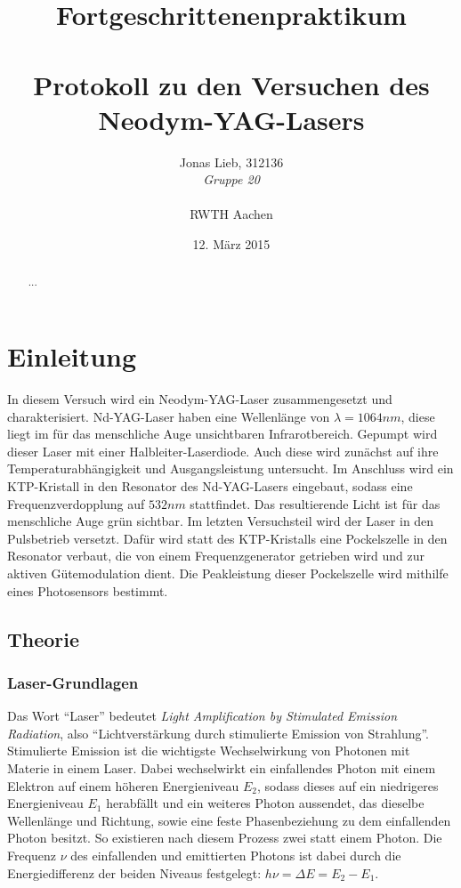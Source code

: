 \documentclass{../Misc/MontavonLaTeX/Montavon}
\date{12. März 2015}
\begin{document}
\title{Fortgeschrittenenpraktikum \\ \quad \\ Protokoll zu den Versuchen des Neodym-YAG-Lasers}
\author{Jonas Lieb, 312136 \\ \emph{Gruppe 20} \\ \\  RWTH Aachen}
\maketitle

\begin{abstract}
...
\end{abstract}
\newpage

\tableofcontents
\newpage

\section{Einleitung}
In diesem Versuch wird ein Neodym-YAG-Laser zusammengesetzt und charakterisiert. Nd-YAG-Laser haben eine Wellenlänge von $\lambda = 1064 \unit{nm}$, diese liegt im für das menschliche Auge unsichtbaren Infrarotbereich. 
Gepumpt wird dieser Laser mit einer Halbleiter-Laserdiode. Auch diese wird zunächst auf ihre Temperaturabhängigkeit und Ausgangsleistung untersucht.
Im Anschluss wird ein KTP-Kristall in den Resonator des Nd-YAG-Lasers eingebaut, sodass eine Frequenzverdopplung auf $532 \unit{nm}$ stattfindet. Das resultierende Licht ist für das menschliche Auge grün sichtbar.
Im letzten Versuchsteil wird der Laser in den Pulsbetrieb versetzt. Dafür wird statt des KTP-Kristalls eine Pockelszelle in den Resonator verbaut, die von einem Frequenzgenerator getrieben wird und zur aktiven Gütemodulation dient. Die Peakleistung dieser Pockelszelle wird mithilfe eines Photosensors bestimmt.

\subsection{Theorie}
\subsubsection{Laser-Grundlagen}
Das Wort \enquote{Laser} bedeutet \emph{Light Amplification by Stimulated Emission Radiation}, also \enquote{Lichtverstärkung durch stimulierte Emission von Strahlung}. Stimulierte Emission ist die wichtigste Wechselwirkung von Photonen mit Materie in einem Laser. Dabei wechselwirkt ein einfallendes Photon mit einem Elektron auf einem höheren Energieniveau $E_2$, sodass dieses auf ein niedrigeres Energieniveau $E_1$ herabfällt und ein weiteres Photon aussendet, das dieselbe Wellenlänge und Richtung, sowie eine feste Phasenbeziehung zu dem einfallenden Photon besitzt. So existieren nach diesem Prozess zwei statt einem Photon. Die Frequenz $\nu$ des einfallenden und emittierten Photons ist dabei durch die Energiedifferenz der beiden Niveaus festgelegt: $h \nu = \Delta E = E_2 - E_1$.
\end{document}
